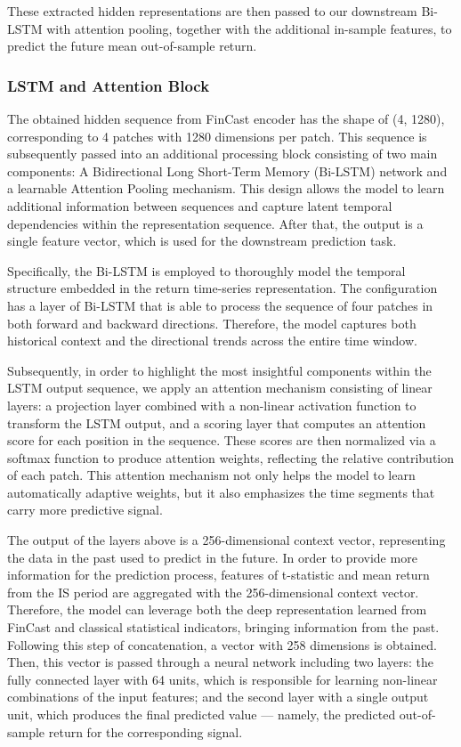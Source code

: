 \documentclass[pdflatex,sn-mathphys-num]{sn-jnl}%
\theoremstyle{thmstyleone}%
\theoremstyle{thmstyletwo}%
\theoremstyle{thmstylethree}%
\begin{document}
These extracted hidden representations are then passed to our downstream Bi-LSTM with attention pooling, together with the additional in-sample features, to predict the future mean out-of-sample return.

\subsubsection{LSTM and Attention Block}\label{subsubModel3}

The obtained hidden sequence from FinCast encoder has the shape of (4, 1280), corresponding to 4 patches with 1280 dimensions per patch. This sequence is subsequently passed into an additional processing block consisting of two main components: A Bidirectional Long Short-Term Memory (Bi-LSTM) network and a learnable Attention Pooling mechanism. This design allows the model to learn additional information between sequences and capture latent temporal dependencies within the representation sequence. After that, the output is a single feature vector, which is used for the downstream prediction task.

Specifically, the Bi-LSTM is employed to thoroughly model the temporal structure embedded in the return time-series representation. The configuration has a layer of Bi-LSTM that is able to process the sequence of four patches in both forward and backward directions. Therefore, the model captures both historical context and the directional trends across the entire time window. 

Subsequently, in order to highlight the most insightful components within the LSTM output sequence, we apply an attention mechanism consisting of linear layers: a projection layer combined with a non-linear activation function to transform the LSTM output, and a scoring layer that computes an attention score for each position in the sequence. These scores are then normalized via a softmax function to produce attention weights, reflecting the relative contribution of each patch. This attention mechanism not only helps the model to learn automatically adaptive weights, but it also emphasizes the time segments that carry more predictive signal. 

The output of the layers above is a 256-dimensional context vector, representing the data in the past used to predict in the future. In order to provide more information for the prediction process, features of t-statistic and mean return from the IS period are aggregated with the 256-dimensional context vector. Therefore, the model can leverage both the deep representation learned from FinCast and classical statistical indicators, bringing information from the past. Following this step of concatenation, a vector with 258 dimensions is obtained. Then, this vector is passed through a neural network including two layers: the fully connected layer with 64 units, which is responsible for learning non-linear combinations of the input features; and the second layer with a single output unit, which produces the final predicted value — namely, the predicted out-of-sample return for the corresponding signal. 
\end{document}
